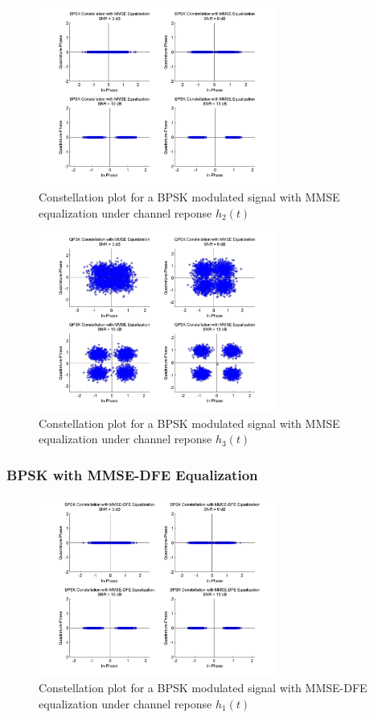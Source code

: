 \documentclass[]{article}
\begin{document}
\begin{figure}[H]
\centering
\includegraphics[width=0.7\textwidth]{bpConstMMSE2.jpg}
\caption{Constellation plot for a BPSK modulated signal with MMSE equalization under channel reponse $h_2(t)$}
\end{figure}

\begin{figure}[H]
\centering
\includegraphics[width=0.7\textwidth]{qpConstMMSE3.jpg}
\caption{Constellation plot for a BPSK modulated signal with MMSE equalization under channel reponse $h_3(t)$}
\end{figure}

\subsubsection{BPSK with MMSE-DFE Equalization}

\begin{figure}[H]
\centering
\includegraphics[width=0.7\textwidth]{bpConstMMSEDFE1.jpg}
\caption{Constellation plot for a BPSK modulated signal with MMSE-DFE equalization under channel reponse $h_1(t)$}
\end{figure}
\end{document}
